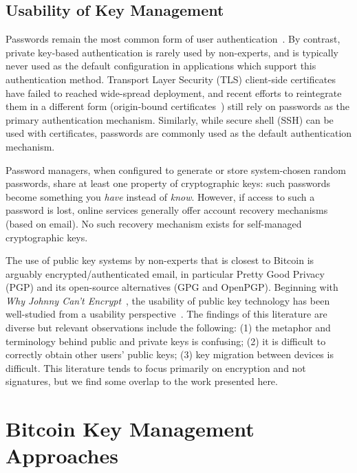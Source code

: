 \subsection{Usability of Key Management}

Passwords remain the most common form of user authentication~\cite{Herley.2012}. By contrast, private key-based authentication is rarely used by non-experts, and is typically never used as the default configuration in applications which support this authentication method. Transport Layer Security (TLS) client-side certificates have failed to reached wide-spread deployment, and recent efforts to reintegrate them in a different form (\eg origin-bound certificates~\cite{DCBW12}) still rely on passwords as the primary authentication mechanism. Similarly, while secure shell (SSH) can be used with certificates, passwords are commonly used as the default authentication mechanism.

Password managers, when configured to generate or store system-chosen random passwords, share at least one property of cryptographic keys: such passwords become something you \emph{have} instead of \emph{know}. However, if access to such a password is lost, online services generally offer account recovery mechanisms (\eg based on email). No such recovery mechanism exists for self-managed cryptographic keys.

The use of public key systems by non-experts that is closest to Bitcoin is arguably encrypted/authenticated email, in particular Pretty Good Privacy (PGP) and its open-source alternatives (\ie GPG and OpenPGP). Beginning with \emph{Why Johnny Can't Encrypt}~\cite{WT99}, the usability of public key technology has been well-studied from a usability perspective~\cite{GM05,GMSN+05,SBKH06,GFF06}. The findings of this literature are diverse but relevant observations include the following: (1) the metaphor and terminology behind public and private keys is confusing; (2) it is difficult to correctly obtain other users' public keys; (3) key migration between devices is difficult. This literature tends to focus primarily on encryption and not signatures, but we find some overlap to the work presented here. 



\section{Bitcoin Key Management Approaches} 
\label{sec:approaches}

